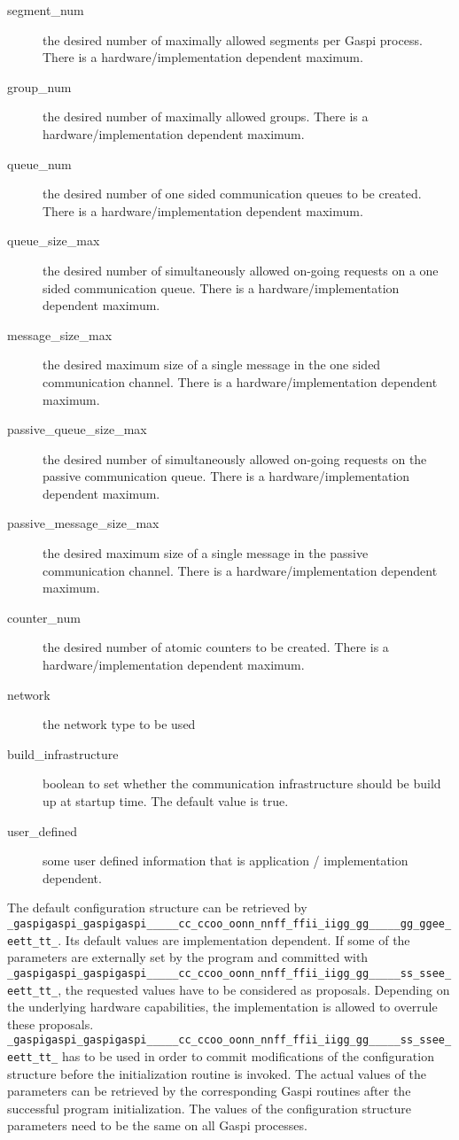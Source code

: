 \documentclass{article}
\makeatletter
\newlength{\st}\setlength{\st}{0pt}
\newcommand{\zerowsep}{\hskip 0pt plus 0.1pt minus 0.1pt}
\newcommand{\ZSEP}[1]{\ifx#1\@@@EOZ@@@\let\next\relax\else\ifx#1\_#1\zerowsep\else#1\fi\let\next\ZSEP\fi\next}
\newcommand{\zsep}[1]{\ZSEP{}#1\@@@EOZ@@@}
\newcommand{\gaspiprefix}{gaspi}
\newcommand{\GASPI}{{\sc Gaspi}}
\newcommand{\function}[1]{{\tt #1}}
\newcommand{\gaspifunction}[1]{\function{\protect\zsep{\gaspiprefix\_#1}}}
\makeatother
\begin{document}
\begin{description}
\item[segment\_num] the desired number of maximally allowed segments per \GASPI{} process.
There is a hardware/implementation dependent maximum.
\item[group\_num] the desired number of maximally allowed groups. There is a hardware/implementation dependent maximum.
\item[queue\_num] the desired number of one sided communication queues to be created. There is a hardware/implementation
dependent maximum.
\item[queue\_size\_max] the desired number of simultaneously allowed on-going requests on a one sided communication queue.
There is a hardware/implementation dependent maximum.
\item[message\_size\_max] the desired maximum size of a single message in the one sided communication channel.
There is a hardware/implementation dependent maximum.
\item[passive\_queue\_size\_max] the desired number of simultaneously allowed on-going requests on the
passive communication queue. There is a hardware/implementation dependent maximum.
\item[passive\_message\_size\_max] the desired maximum size of a single message in the passive communication channel.
There is a hardware/implementation dependent maximum.
\item[counter\_num] the desired number of atomic counters to be created.
There is a hardware/implementation dependent maximum.
\item[network] the network type to be used
\item[build\_infrastructure] boolean to set whether the communication infrastructure should
be build up at startup time. The default value is true.
\item[user\_defined] some user defined information that is application / implementation dependent.
\end{description}

The default configuration structure can be retrieved by \gaspifunction{config\_get}.
Its default values are implementation dependent. If
some of the parameters are externally set by the program and committed with \gaspifunction{config\_set}, 
the requested values have to be considered as proposals.
Depending on the underlying hardware capabilities,
the implementation is allowed to overrule these proposals.
\gaspifunction{config\_set} has to be used in order to commit modifications
of the configuration structure before the initialization routine is invoked. 
The actual values of the parameters can be retrieved by the corresponding \GASPI{}
routines after the successful program initialization. The values of the configuration
structure parameters need to be the same on all \GASPI{} processes.
\end{document}
